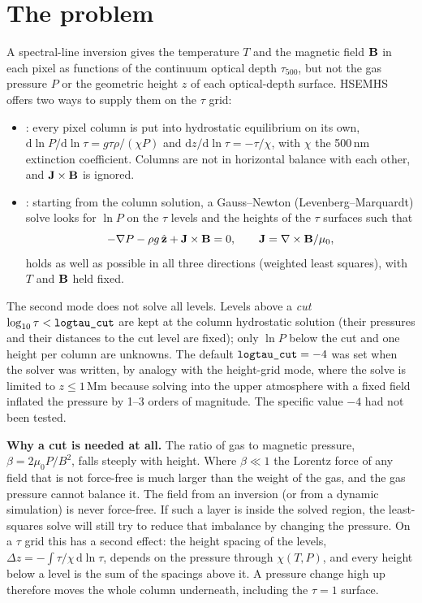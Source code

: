 \section{The problem}
A spectral-line inversion gives the temperature $T$ and the magnetic field $\mathbf B$ in each pixel as functions of the continuum
optical depth $\tau_{500}$, but not the gas pressure $P$ or the geometric height $z$ of each optical-depth surface. HSEMHS
offers two ways to supply them on the $\tau$ grid:
\begin{itemize}
\item {}: every pixel column is put into hydrostatic equilibrium on its own,
$\mathrm d\ln P/\mathrm d\ln\tau = g\tau\rho/(\chi P)$ and $\mathrm dz/\mathrm d\ln\tau=-\tau/\chi$, with $\chi$ the
500\,nm extinction coefficient. Columns are not in horizontal balance with each other, and $\mathbf J\times\mathbf B$ is ignored.
\item {}: starting from the column solution, a Gauss--Newton (Levenberg--Marquardt) solve looks for
$\ln P$ on the $\tau$ levels and the heights of the $\tau$ surfaces such that
\begin{equation}
-\nabla P - \rho g\,\hat{\mathbf z} + \mathbf J\times\mathbf B = 0,\qquad \mathbf J=\nabla\times\mathbf B/\mu_0,
\end{equation}
holds as well as possible in all three directions (weighted least squares), with $T$ and $\mathbf B$ held fixed.
\end{itemize}
The second mode does not solve all levels. Levels above a \emph{cut} $\log_{10}\tau<\texttt{logtau\_cut}$ are kept at the
column hydrostatic solution (their pressures and their distances to the cut level are fixed); only $\ln P$ below the cut and
one height per column are unknowns. The default $\texttt{logtau\_cut}=-4$ was set when the solver was written, by analogy
with the height-grid mode, where the solve is limited to $z\le1$\,Mm because solving into the upper atmosphere with a fixed
field inflated the pressure by 1--3 orders of magnitude. The specific value $-4$ had not been tested.

\textbf{Why a cut is needed at all.} The ratio of gas to magnetic pressure, $\beta=2\mu_0P/B^2$, falls steeply with height.
Where $\beta\ll1$ the Lorentz force of any field that is not force-free is much larger than the weight of the gas, and the
gas pressure cannot balance it. The field from an inversion (or from a dynamic simulation) is never force-free. If such a
layer is inside the solved region, the least-squares solve will still try to reduce that imbalance by changing the pressure.
On a $\tau$ grid this has a second effect: the height spacing of the levels, $\Delta z=-\int\tau/\chi\,\mathrm d\ln\tau$,
depends on the pressure through $\chi(T,P)$, and every height below a level is the sum of the spacings above it. A pressure
change high up therefore moves the whole column underneath, including the $\tau=1$ surface.

